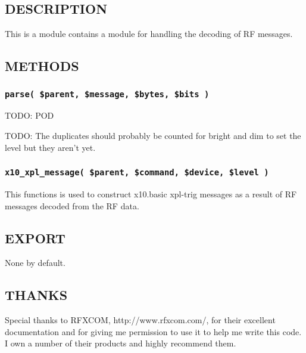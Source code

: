 \subsection*{DESCRIPTION\label{xPL::RF::X10_DESCRIPTION}}


This is a module contains a module for handling the decoding of RF
messages.

\subsection*{METHODS\label{xPL::RF::X10_METHODS}}
\subsubsection*{\texttt{parse( \$parent, \$message, \$bytes, \$bits )}\label{xPL::RF::X10_parse_parent_message_bytes_bits_}}


TODO: POD



TODO: The duplicates should probably be counted for bright and dim to set
the level but they aren't yet.

\subsubsection*{\texttt{x10\_xpl\_message( \$parent, \$command, \$device, \$level )}\label{xPL::RF::X10_x10_xpl_message_parent_command_device_level_}}


This functions is used to construct x10.basic xpl-trig messages as a
result of RF messages decoded from the RF data.

\subsection*{EXPORT\label{xPL::RF::X10_EXPORT}}


None by default.

\subsection*{THANKS\label{xPL::RF::X10_THANKS}}


Special thanks to RFXCOM, \textsf{http://www.rfxcom.com/}, for their
excellent documentation and for giving me permission to use it to help
me write this code.  I own a number of their products and highly
recommend them.

